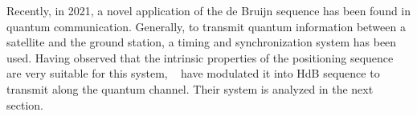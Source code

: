 Recently, in 2021, a novel application of the de Bruijn sequence has been found in quantum communication. Generally, to transmit quantum information between a satellite and the ground station, a timing and synchronization system has been used. Having observed that the intrinsic properties of the positioning sequence are very suitable for this system, \citeauthor{zhang2021timing}~\cite{zhang2021timing} have modulated it into \gls{HdB} sequence to transmit along the quantum channel. Their system is analyzed in the next section.




